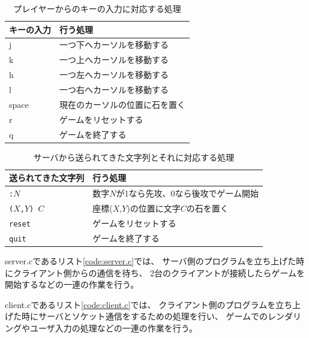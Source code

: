 \documentclass[a4j, titlepage, 10pt]{jsarticle}
\newcommand{\code}[1]{\texttt{#1}}
\begin{document}
\begin{table}[H]
  \centering
  \caption{プレイヤーからのキーの入力に対応する処理}
  \label{tab:player-key-mapping}
  \begin{tabular}{ll} \toprule
    キーの入力 & 行う処理 \\
    \midrule
    j & 一つ下へカーソルを移動する \\
    k & 一つ上へカーソルを移動する \\
    h & 一つ左へカーソルを移動する \\
    l & 一つ右へカーソルを移動する \\
    space & 現在のカーソルの位置に石を置く \\
    r & ゲームをリセットする \\
    q & ゲームを終了する \\
    \bottomrule
  \end{tabular}
\end{table}

\begin{table}[H]
  \centering
  \caption{サーバから送られてきた文字列とそれに対応する処理}
  \label{tab:mapping-received-str-and-corresponding-process}
  \begin{tabular}{ll} \toprule
    送られてきた文字列 & 行う処理 \\
    \midrule
    \code{:$N$} & 数字$N$が1なら先攻、0なら後攻でゲーム開始 \\
    \code{($X$,$Y$) $C$} & 座標($X$,$Y$)の位置に文字$C$の石を置く \\
    \code{reset} & ゲームをリセットする \\
    \code{quit} & ゲームを終了する \\
    \bottomrule
  \end{tabular}
\end{table}

server.cであるリスト\ref{code:server.c}では、
サーバ側のプログラムを立ち上げた時にクライアント側からの通信を待ち、
2台のクライアントが接続したらゲームを開始するなどの一連の作業を行う。

\lstset{ numbers = left }


client.cであるリスト\ref{code:client.c}では、
クライアント側のプログラムを立ち上げた時にサーバとソケット通信をするための処理を行い、
ゲームでのレンダリングやユーザ入力の処理などの一連の作業を行う。

\lstset{ numbers = left }

\end{document}
